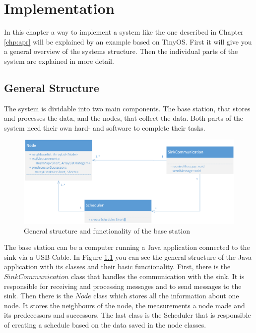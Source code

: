 \chapter{Implementation}
\label{chp:imp}

In this chapter a way to implement a system like the one described in Chapter \ref{chp:apr} will be explained by an example based on TinyOS. First it will give you a general overview of the systems structure. Then the individual parts of the system are explained in more detail.    

\section{General Structure}
\label{chp:imp_general}
The system is dividable into two main components. The base station, that stores and processes the data, and the nodes, that collect the data. Both parts of the system need their own hard- and software to complete their tasks.  

\begin{figure}[htbp]
	\centering
    \includegraphics[scale=0.7]{content/images/BaseStation/Klassendiagram}
   	\caption{General structure and functionality of the base station}
    \label{fig:bsKlassen}
\end{figure}

The base station can be a computer running a Java application connected to the sink via a USB-Cable. In Figure \ref{fig:bsKlassen} you can see the general structure of the Java application with its classes and their basic functionality. First, there is the $SinkCommunication$ class that handles the communication with the sink. It is responsible for receiving and processing messages and to send messages to the sink. Then there is the $Node$ class which stores all the information about one node. It stores the neighbours of the node, the measurements a node made and its predecessors and successors. The last class is the Scheduler that is responsible of creating a schedule based on the data saved in the node classes.  

